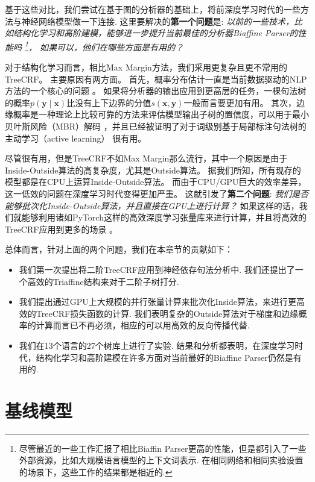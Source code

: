 基于这些对比，我们尝试在基于图的分析器的基础上，将前深度学习时代的一些方法与神经网络模型做一下连接.
这里要解决的\textbf{第一个问题}是:
\emph{
	以前的一些技术，比如结构化学习和高阶建模，能够进一步提升当前最佳的分析器Biaffine Parser的性能吗
	\footnote{
		尽管最近的一些工作汇报了相比Biaffin Parser更高的性能，但是都引入了一些外部资源，比如大规模语言模型的上下文词表示.
		在相同网络和相同实验设置的场景下，这些工作的结果都是相近的.
	}，
	如果可以，他们在哪些方面是有用的？
}

对于结构化学习而言，相比Max Margin方法，我们采用更复杂且更不常用的TreeCRF。
主要原因有两方面。
首先，概率分布估计一直是当前数据驱动的NLP方法的一个核心的问题 \citep{le-zuidema-2014-inside}。
如果将分析器的输出应用到更高层的任务，一棵句法树的概率$p(\boldsymbol{y}\mid\boldsymbol{x})$比没有上下边界的分值$s (\boldsymbol{x},\boldsymbol{y})$一般而言要更加有用。
其次，边缘概率是一种理论上比较可靠的方法来评估模型输出子树的置信度，可以用于最小贝叶斯风险（MBR）解码 \citep{smith-smith-2007-probabilistic}，并且已经被证明了对于词级别基于局部标注句法树的主动学习（active learning） \citep{li-etal-2016-active}很有用。

尽管很有用，但是TreeCRF不如Max Margin那么流行，其中一个原因是由于Inside-Outside算法的高复杂度，尤其是Outside算法。
据我们所知，所有现存的模型都是在CPU上运算Inside-Outside算法。
而由于CPU/GPU巨大的效率差异，这一低效的问题在深度学习时代变得更加严重。
这就引发了\textbf{第二个问题}:
\emph{我们是否能够批次化Inside-Outside算法，并且直接在GPU上进行计算？}
如果这样的话，我们就能够利用诸如PyTorch这样的高效深度学习张量库来进行计算，并且将高效的TreeCRF应用到更多的场景 \citep{cai-etal-2017-crf,le-zuidema-2014-inside}。

总体而言，针对上面的两个问题，我们在本章节的贡献如下：
\begin{itemize}
	\item 我们第一次提出将二阶TreeCRF应用到神经依存句法分析中.
	      我们还提出了一个高效的Triaffine结构来对于二阶子树打分.
	\item 我们提出通过GPU上大规模的并行张量计算来批次化Inside算法，来进行更高效的TreeCRF损失函数的计算.
	      我们表明复杂的Outside算法对于梯度和边缘概率的计算而言已不再必须，相应的可以用高效的反向传播代替.
	\item 我们在13个语言的27个树库上进行了实验.
	      结果和分析都表明，在深度学习时代，结构化学习和高阶建模在许多方面对当前最好的Biaffine Parser仍然是有用的.
\end{itemize}

\section{基线模型}
\label{sec:dep-basic-model}

